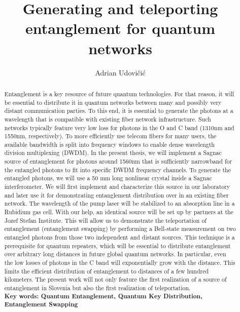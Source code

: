 \documentclass{article}
\title{Generating and teleporting entanglement for quantum networks}
\author{Adrian Udovičić}
\date{}
\begin{document}
\maketitle

\begin{abstract}
Entanglement is a key resource of future quantum technologies. For that reason, it will be essential to distribute 
it in quantum networks between many and possibly very distant communication parties. To this end, it is essential 
to generate the photons at a wavelength that is compatible with existing fiber network infrastructure. Such networks typically feature 
very low loss for photons in the O and C band (1310nm and 1550nm, respectively). To more 
efficiently use telecom fibers for many users, the available bandwidth is split into frequency windows to enable dense wavelength 
division multiplexing (DWDM). In the present thesis, we will implement a Sagnac source of entanglement for photons around 1560nm 
that is sufficiently narrowband for the entangled photons to fit into specific DWDM frequency channels. To generate the 
entangled photons, we will use a 50 mm long nonlinear crystal inside a Sagnac interferometer. We will first 
implement and characterize this source in our laboratory and later use it for demonstrating entanglement distribution over in an existing 
fiber network. The wavelength of the pump laser will be stabilized to an absorption line in a Rubidium gas cell. 
With our help, an identical source will be set up by partners at the Jozef Stefan Institute. This will allow us to demonstrate the teleportation of entanglement 
(entanglement swapping) by performing a Bell-state measurement on two entangled photons from those two independent and distant sources. This technique is a prerequisite for quantum 
repeaters, which will be essential to distribute entanglement over arbitrary long distances in future global quantum networks. In particular, even the low losses of photons in 
the C band will exponentially grow with the distance. This limits the efficient distribution of entanglement to distances of a few hundred kilometers.
The present work will not only feature the first realization of a source of entanglement in Slovenia but also the first realization of teleportation.\\
\textbf{Key words: Quantum Entanglement, Quantum Key Distribution, Entanglement Swapping}
\end{abstract}
\end{document}
